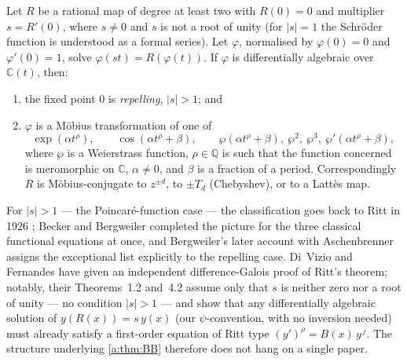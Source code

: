 \begin{theorem}
\label{a:thm:BB}
Let $R$ be a rational map of degree at least two with $R(0)=0$ and multiplier
$s=R'(0)$, where $s\neq0$ and $s$ is not a root of unity (for $|s|=1$ the
Schr\"oder function is understood as a formal series). Let $\varphi$, normalised
by $\varphi(0)=0$ and $\varphi'(0)=1$, solve $\varphi(st)=R(\varphi(t))$. If
$\varphi$ is differentially algebraic over $\mathbb{C}(t)$, then:
\begin{enumerate}[label=\textup{(\roman*)}]
\item the fixed point $0$ is \emph{repelling}, $|s|>1$; and
\item $\varphi$ is a M\"obius transformation of one of
\begin{equation*}
\exp(\alpha t^{\rho}),
\qquad
\cos(\alpha t^{\rho}+\beta),
\qquad
\wp(\alpha t^{\rho}+\beta),\ \wp^{2},\ \wp^{3},\ \wp'(\alpha t^{\rho}+\beta),
\end{equation*}
where $\wp$ is a Weierstrass function, $\rho\in\mathbb{Q}$ is such that the
function concerned is meromorphic on $\mathbb{C}$, $\alpha\neq0$, and $\beta$ is a
fraction of a period. Correspondingly $R$ is M\"obius-conjugate to $z^{\pm d}$, to
$\pm T_d$ (Chebyshev), or to a Latt\`es map.
\end{enumerate}
\end{theorem}

\begin{remark}
\label{a:rem:lineage}
For $|s|>1$ --- the Poincar\'e-function case --- the classification goes back to
Ritt in 1926 \cite{Ritt1926}; Becker and Bergweiler completed the picture for the
three classical functional equations at once, and Bergweiler's later account with
Aschenbrenner \cite{AschenbrennerBergweiler2015} assigns the exceptional list
explicitly to the repelling case. Di~Vizio and Fernandes
\cite{DiVizioFernandes2021} have given an independent difference-Galois proof of
Ritt's theorem; notably, their Theorems~1.2 and~4.2 assume only that $s$ is
neither zero nor a root of unity --- no condition $|s|>1$ --- and show that any
differentially algebraic solution of $y(R(x))=s\,y(x)$ (our $\psi$-convention,
with no inversion needed) must already satisfy a first-order equation of Ritt type
$(y')^{\rho}=B(x)\,y^{\,j}$. The structure underlying \cref{a:thm:BB} therefore
does not hang on a single paper.
\end{remark}

